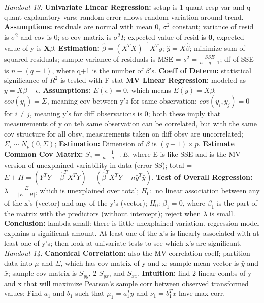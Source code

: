 \documentclass[9pt]{extarticle}
\begin{document}
\textit{Handout 13:}
\textbf{Univariate Linear Regression:} setup is 1 quant resp var and q quant 
explanatory vars; random error allows random variation around trend.
\textbf{Assumptions:} residuals are normal with mean 0, $\sigma^2$ constant;
variance of resid is $\sigma^2$ and cov is 0; so cov matrix is $\sigma^2I$; 
expected value of resid is \textbf{0}, expected value of y is $\textbf{X}\beta$.
\textbf{Estimation:} $\hat{\beta} = (X^TX)^{-1}X^Ty$; $\hat{y} = X\hat{\beta}$;
minimize sum of squared residuals; sample variance of residuals is MSE = $s^2 = 
\frac{SSE}{n-q-1}$; df of SSE is $n-(q+1)$, where q+1 is the number of $\beta$'s.
\textbf{Coeff of Determ:} statistical significance of $R^2$ is tested with F-stat
\textbf{MV Linear Regression:} modeled as $y = X\beta + \epsilon$.
\textbf{Assumptions:} $E(\epsilon) = 0$, which means $E(y) = X\beta$; 
$cov(y_i) = \Sigma$, meaning cov between y's for same observation; $cov(y_i, 
y_j) = 0$ for $i \neq j$, meaning y's for diff observations is 0; both these 
imply that measurements of y on teh same observation can be correlated, but with 
the same cov structure for all obsv, measurements taken on diff obsv are 
uncorrelated; $\Sigma_i \sim N_p(0, \Sigma)$;
\textbf{Estimation:} Dimension of $\beta$ is $(q+1)\times p$.
\textbf{Estimate Common Cov Matrix:} $S_e = \frac{1}{n-q-1}E$, where E is like 
SSE and is the MV version of unexplained variability in data (error SS); total 
= $E + H = (Y^TY - \hat{\beta}^TX^TY) + (\hat{\beta}^TX^TY - n\bar{y}^T\bar{y})$.
\textbf{Test of Overall Regression:} $\lambda = \frac{|E|}{|E + H|}$, which 
is unexplained over total; $H_0:$ no linear association between any of the x's 
(vector) and any of the y's (vector); $H_0$: $\beta_1 = 0$, where $\beta_1$ is 
the part of the matrix with the predictors (without intercept); reject when 
$\lambda$ is small.
\textbf{Conclusion:} lambda small: there is little unexplained variation. 
regression model explains a significant amount. At least one of the x's is 
linearly associated with at least one of y's; then look at univariate tests to
see which x's are significant.
\textit{Handout 14:}
\textbf{Canonical Correlation:} also the MV correlation coeff; partition data
into $\mu$ and $\Sigma$, which has cov matrix of y and x; sample mean vector 
is $\bar{y}$ and $\bar{x}$; sample cov matrix is $S_{yy}$, 2 $S_{yx}$, and 
$S_{xx}$.
\textbf{Intuition:} find 2 linear combs of y and x that will maximize Pearson's 
sample corr between observed transformed values; Find $a_1$ and $b_1$ such that 
$\mu_1 = a_1^Ty$ and $\nu_1 = b_1^Tx$ have max corr.
\end{document}
